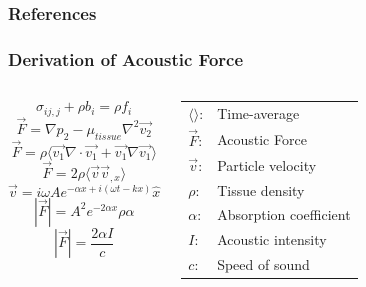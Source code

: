\documentclass{beamer}
\begin{document}
		\begin{frame}[allowframebreaks]
			\frametitle{References}
			\tiny
			\label{refs}
			
			
		\end{frame}

		\begin{frame}[label=arfiForceDerivation]
			\frametitle{Derivation of Acoustic Force}
			\begin{columns}[c]
					\begin{equation*}
						\label{equ:arfi_linear_momentum}
						\sigma_{ij,j} + \rho b_i = \rho f_i
					\end{equation*}
					\begin{equation*}
						\label{equ:radiation_force_1a}
						\vec{F} = \nabla p_2 - \mu_{tissue} \nabla^2 \vec{v_2}
					\end{equation*}
					\begin{equation*}
						\label{equ:radiation_force_1b}
						\vec{F} = \rho \langle\vec{v_1}\nabla\cdot\vec{v_1} + \vec{v_1}\nabla\vec{v_1}\rangle 
					\end{equation*}
					\begin{equation*}
						\label{equ:radiation_force_2}
						\vec{F} = 2\rho\langle \vec{v} \vec{v}_{,x} \rangle
					\end{equation*}
					\begin{equation*}
						\label{equ:particle_velocity}
						\vec{v} = i\omega A e^{-\alpha x + i\left(\omega t - k x\right)}\hat{x}
					\end{equation*}
					\begin{equation*}
						\label{equ:radiation_force_3}
						\left|\vec{F}\right| = A^2 e^{-2\alpha x}\rho\alpha
					\end{equation*}
					\begin{equation*}
						\label{equ:radiation_force}
						\boxed{\left|\vec{F}\right| = \frac{2\alpha I}{c}}
					\end{equation*}

					\begin{center}
						\begin{tabular}{ll}
							$\langle\rangle$: & Time-average \\
							$\vec{F}$: & Acoustic Force \\
							$\vec{v}$: & Particle velocity \\
							$\rho$: & Tissue density \\
							$\alpha$: & Absorption coefficient \\
							$I$: & Acoustic intensity \\
							$c$: & Speed of sound \\
						\end{tabular}
					\end{center}
			\end{columns}
		\end{frame}
\end{document}
